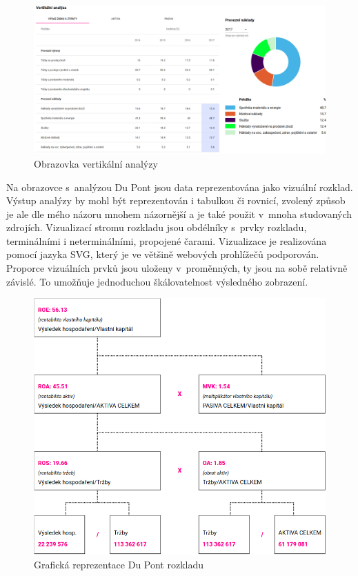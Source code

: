 \begin{figure}[!htb]
  \centering
  \includegraphics[width=14.5cm]{img/scr_ver.png}
  \caption{Obrazovka vertikální analýzy}
\end{figure}

\pagebreak
Na obrazovce s~analýzou Du Pont jsou data reprezentována jako vizuální rozklad. Výstup analýzy by mohl být reprezentován i tabulkou či rovnicí, zvolený způsob je ale dle mého názoru mnohem názornější a je také použit v~mnoha studovaných zdrojích. Vizualizací stromu rozkladu jsou obdélníky s~prvky rozkladu, terminálními i neterminálními, propojené čarami. Vizualizace je realizována pomocí jazyka SVG, který je ve většině webových prohlížečů podporován. Proporce vizuálních prvků jsou uloženy v~proměnných, ty jsou na sobě relativně závislé. To umožňuje jednoduchou škálovatelnost výsledného zobrazení.

\begin{figure}[!htb]
  \centering
  \includegraphics[width=13cm]{img/scr_dupont.png}
  \caption{Grafická reprezentace Du Pont rozkladu}
\end{figure}

